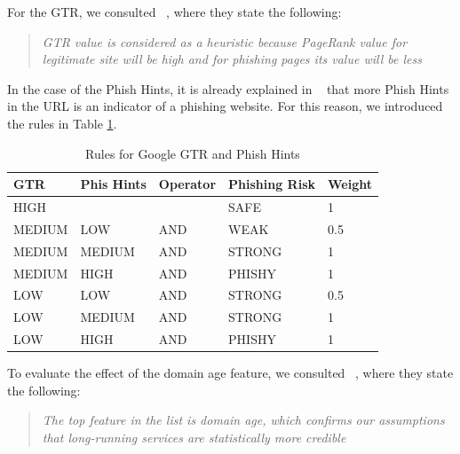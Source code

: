\documentclass[11pt]{article}
\begin{document}
For the GTR, we consulted ~\cite{GTR}, where they state the following:

\begin{quote}
    \textit{GTR value is considered as a heuristic because PageRank value for legitimate site will be high and for phishing pages its value will be less}
\end{quote}

In the case of the Phish Hints, it is already explained in ~\cite{mainpaper} that more Phish Hints in the URL is an indicator of a phishing website. For this reason, we introduced the rules in Table \ref{page_rank_phish_hints_rules}.

\begin{table}[h]
    \centering
    \begin{tabular}{|l|l|l|l|l|}
    \hline
    \textbf{GTR} & \textbf{Phis Hints} & \textbf{Operator} & \textbf{Phishing Risk} & \textbf{Weight} \\ \hline
    HIGH               &                     &                   & SAFE                   & 1               \\ \hline
    MEDIUM             & LOW                 & AND               & WEAK                   & 0.5             \\ \hline
    MEDIUM             & MEDIUM              & AND               & STRONG                 & 1               \\ \hline
    MEDIUM             & HIGH                & AND               & PHISHY                 & 1               \\ \hline
    LOW                & LOW                 & AND               & STRONG                 & 0.5             \\ \hline
    LOW                & MEDIUM              & AND               & STRONG                 & 1               \\ \hline
    LOW                & HIGH                & AND               & PHISHY                 & 1               \\ \hline
    \end{tabular}
    \caption{Rules for Google GTR and Phish Hints}
    \label{page_rank_phish_hints_rules}
\end{table}


To evaluate the effect of the domain age feature, we consulted ~\cite{domainage}, where they state the following:

\begin{quote}
\textit{The top feature in the list is domain age, which confirms our assumptions that long-running services are statistically more credible}
\end{quote}
\end{document}

